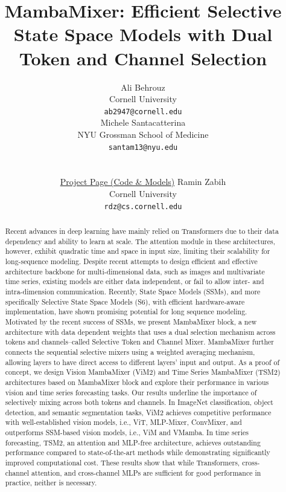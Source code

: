 \documentclass{article}
\title{MambaMixer: Efficient Selective State Space Models with Dual Token and Channel Selection}
\author{%
  Ali Behrouz \\
  Cornell University\\
  \texttt{ab2947@cornell.edu} \\
  \And
    Michele Santacatterina \\
  NYU Grossman School of Medicine\\
  \texttt{santam13@nyu.edu} \\
  \newline
  \\
  \\
  \newline
  \href{https://MambaMixer.github.io}{Project Page (Code \& Models)}
  \And
    Ramin Zabih \\
  Cornell University\\
  \texttt{rdz@cs.cornell.edu} \\
}
\begin{document}
\maketitle



\doparttoc %
\faketableofcontents %


\begin{abstract}
  Recent advances in deep learning have mainly relied on Transformers due to their data dependency and ability to learn at scale. The attention module in these architectures, however, exhibit quadratic time and space in input size, limiting their scalability for long-sequence modeling. Despite recent attempts to design efficient and effective architecture backbone for multi-dimensional data, such as images and multivariate time series, existing models are either data independent, or fail to allow inter- and intra-dimension communication. Recently, State Space Models (SSMs), and more specifically Selective State Space Models (S6), with efficient hardware-aware implementation, have shown promising potential for long sequence modeling. Motivated by the recent success of SSMs, we present MambaMixer block, a new architecture with data dependent weights that uses a dual selection mechanism across tokens and channels–called Selective Token and Channel Mixer. MambaMixer further connects the sequential selective mixers using a weighted averaging mechanism, allowing layers to have direct access to different layers' input and output. As a proof of concept, we design Vision MambaMixer (ViM2) and Time Series MambaMixer (TSM2) architectures based on MambaMixer block and explore their performance in various vision and time series forecasting tasks. Our results underline the importance of selectively mixing across both tokens and channels. In ImageNet classification, object detection, and semantic segmentation tasks, ViM2 achieves competitive performance with well-established vision models, i.e., ViT, MLP-Mixer, ConvMixer, and outperforms SSM-based vision models, i.e., ViM and VMamba. In time series forecasting, TSM2, an attention and MLP-free architecture, achieves outstanding performance compared to state-of-the-art methods while demonstrating significantly improved computational cost. These results show that while Transformers, cross-channel attention, and cross-channel MLPs are sufficient for good performance in practice, neither is necessary.
\end{abstract}
 
\end{document}
